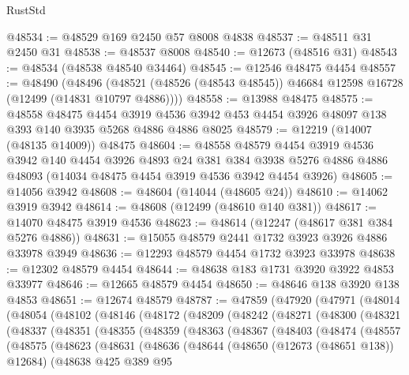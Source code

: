 \begin{lexlean}{RustStd}
\begin{coremodule}
{\begin{coremodule}
{{{{{{{{{{{{{{{{{{{{{{{{{{{{{{{{{{{{{{{{{{{{{{{{{{{{{{{{{{{{{{{{{{{{{{{{{{{{{{{{@48534 := @48529 @169 @2450 @57 @8008 @4838
@48537 := @48511 @31 @2450 @31
@48538 := @48537 @8008
@48540 := @12673 (@48516 @31)
@48543 := @48534 (@48538 @48540 @34464)
@48545 := @12546 @48475 @4454
@48557 := @48490
    (@48496 (@48521 (@48526 (@48543 @48545)) @46684 @12598 @16728 (@12499 (@14831 @10797 @4886))))
@48558 := @13988 @48475
@48575 := @48558
    @48475
    @4454
    @3919
    @4536
    @3942
    @453
    @4454
    @3926
    @48097
    @138
    @393
    @140
    @3935
    @5268
    @4886
    @4886
    @8025
@48579 := @12219 (@14007 (@48135 @14009)) @48475
@48604 := @48558
    @48579
    @4454
    @3919
    @4536
    @3942
    @140
    @4454
    @3926
    @4893
    @24
    @381
    @384
    @3938
    @5276
    @4886
    @4886
    @48093
    (@14034 @48475 @4454 @3919 @4536 @3942 @4454 @3926)
@48605 := @14056 @3942
@48608 := @48604 (@14044 (@48605 @24))
@48610 := @14062 @3919 @3942
@48614 := @48608 (@12499 (@48610 @140 @381))
@48617 := @14070 @48475 @3919 @4536
@48623 := @48614 (@12247 (@48617 @381 @384 @5276 @4886))
@48631 := @15055 @48579 @2441 @1732 @3923 @3926 @4886 @33978 @3949
@48636 := @12293 @48579 @4454 @1732 @3923 @33978
@48638 := @12302 @48579 @4454
@48644 := @48638 @183 @1731 @3920 @3922 @4853 @33977
@48646 := @12665 @48579 @4454
@48650 := @48646 @138 @3920 @138 @4853
@48651 := @12674 @48579
@48787 := @47859
    (@47920
      (@47971
        (@48014
          (@48054
            (@48102
              (@48146
                (@48172
                  (@48209
                    (@48242
                      (@48271
                        (@48300
                          (@48321
                            (@48337
                              (@48351
                                (@48355
                                  (@48359
                                    (@48363
                                      (@48367
                                        (@48403
                                          (@48474
                                            (@48557
                                              (@48575
                                                (@48623
                                                  (@48631
                                                    (@48636
                                                      (@48644
                                                        (@48650 (@12673 (@48651 @138)) @12684)
                                                        (@48638
                                                          @425
                                                          @389
                                                          @95
}}}}}}}}}}}}}}}}}}}}}}}}}}}}}}}}}}}}}}}}}}}}}}}}}}}}}}}}}}}}}}}}}}}}}}}}}}}}}}}}
\end{coremodule}}
\end{coremodule}
\end{lexlean}
